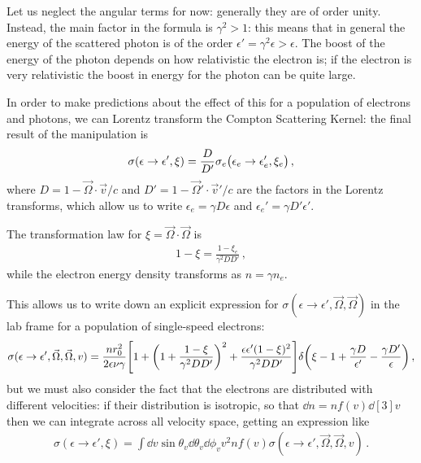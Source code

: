 \documentclass[main.tex]{subfiles}
\begin{document}

Let us neglect the angular terms for now: generally they are of order unity. Instead, the main factor in the formula is \(\gamma^2>1\): this means that in general the energy of the scattered photon is of the order \(\epsilon ' = \gamma^2 \epsilon > \epsilon  \). 
The boost of the energy of the photon depends on how relativistic the electron is; if the electron is very relativistic the boost in energy for the photon can be quite large. 

In order to make predictions about the effect of this for a population of electrons and photons, we can Lorentz transform the Compton Scattering Kernel: the final result of the manipulation is
%
\begin{align}
\sigma (\epsilon \to \epsilon ', \xi ) = \frac{D}{D'} \sigma_e \qty(\epsilon _e \to \epsilon _e', \xi _e)
\,,
\end{align}
%
where \(D = 1 - \vec{\Omega} \cdot \vec{v} / c\) and \(D' = 1 - \vec{\Omega}' \cdot \vec{v}' / c \) are the factors in the Lorentz transforms, which allow us to write \(\epsilon _e = \gamma D \epsilon \) and \(\epsilon _e' = \gamma D' \epsilon '\).

The transformation law for \(\xi = \vec{\Omega} \cdot \vec{\Omega}\) is 
%
\begin{align}
1 - \xi = \frac{1 - \xi _e}{\gamma^2 D D'}
\,,
\end{align}
%
while the electron energy density transforms as \(n = \gamma n_e\). 

This allows us to write down an explicit expression for \(\sigma (\epsilon \to \epsilon ', \vec{\Omega}, \vec{\Omega})\) in the lab frame for a population of single-speed electrons:
%
\begin{align}
\sigma (\epsilon \to \epsilon ', \vec{\Omega}, \vec{\Omega}, v) 
= 
\frac{n r_0^2}{2 \epsilon \nu \gamma } 
\qty[1 + \qty(1 + \frac{1 - \xi }{\gamma^2 D D'})^2
+ \frac{\epsilon \epsilon ' (1 - \xi )^2}{\gamma^2 D D'}]
\delta \qty(\xi -1 + \frac{\gamma D}{\epsilon'} - \frac{\gamma D'}{\epsilon })
\,,
\end{align}
%
but we must also consider the fact that the electrons are distributed with different velocities: if their distribution is isotropic, so that \(\dd{n} = n f(v) \dd[3]{v}\) then we can integrate across all velocity space, getting an expression like 
%
\begin{align}
\sigma (\epsilon \to \epsilon ', \xi )
= \int \dd{v} \sin \theta_v \dd{\theta _v} \dd{\phi _v}
 v^2 n f(v) 
\sigma (\epsilon \to \epsilon ', \vec{\Omega}, \vec{\Omega}, v)  
\,.
\end{align}
\end{document}

